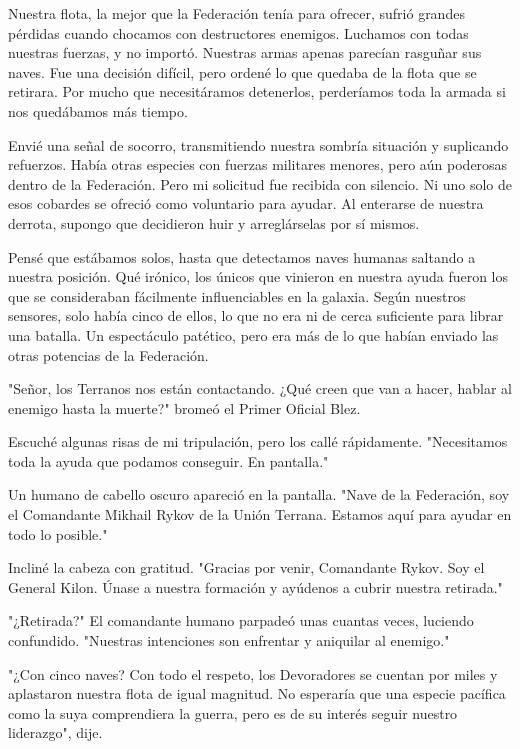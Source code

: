 \documentclass[spanish,12pt,a4paper,oneside,titlepage]{book}
\begin{document}
    Nuestra flota, la mejor que la Federación tenía para ofrecer, sufrió grandes pérdidas cuando chocamos con destructores enemigos. Luchamos con todas nuestras fuerzas, y no importó. Nuestras armas apenas parecían rasguñar sus naves. Fue una decisión difícil, pero ordené lo que quedaba de la flota que se retirara. Por mucho que necesitáramos detenerlos, perderíamos toda la armada si nos quedábamos más tiempo.

    Envié una señal de socorro, transmitiendo nuestra sombría situación y suplicando refuerzos. Había otras especies con fuerzas militares menores, pero aún poderosas dentro de la Federación. Pero mi solicitud fue recibida con silencio. Ni uno solo de esos cobardes se ofreció como voluntario para ayudar. Al enterarse de nuestra derrota, supongo que decidieron huir y arreglárselas por sí mismos.

    Pensé que estábamos solos, hasta que detectamos naves humanas saltando a nuestra posición. Qué irónico, los únicos que vinieron en nuestra ayuda fueron los que se consideraban fácilmente influenciables en la galaxia. Según nuestros sensores, solo había cinco de ellos, lo que no era ni de cerca suficiente para librar una batalla. Un espectáculo patético, pero era más de lo que habían enviado las otras potencias de la Federación.

    "Señor, los Terranos nos están contactando. ¿Qué creen que van a hacer, hablar al enemigo hasta la muerte?" bromeó el Primer Oficial Blez.

    Escuché algunas risas de mi tripulación, pero los callé rápidamente. "Necesitamos toda la ayuda que podamos conseguir. En pantalla."

    Un humano de cabello oscuro apareció en la pantalla. "Nave de la Federación, soy el Comandante Mikhail Rykov de la Unión Terrana. Estamos aquí para ayudar en todo lo posible."

    Incliné la cabeza con gratitud. "Gracias por venir, Comandante Rykov. Soy el General Kilon. Únase a nuestra formación y ayúdenos a cubrir nuestra retirada."

    "¿Retirada?" El comandante humano parpadeó unas cuantas veces, luciendo confundido. "Nuestras intenciones son enfrentar y aniquilar al enemigo."

    "¿Con cinco naves? Con todo el respeto, los Devoradores se cuentan por miles y aplastaron nuestra flota de igual magnitud. No esperaría que una especie pacífica como la suya comprendiera la guerra, pero es de su interés seguir nuestro liderazgo", dije.
\end{document}
